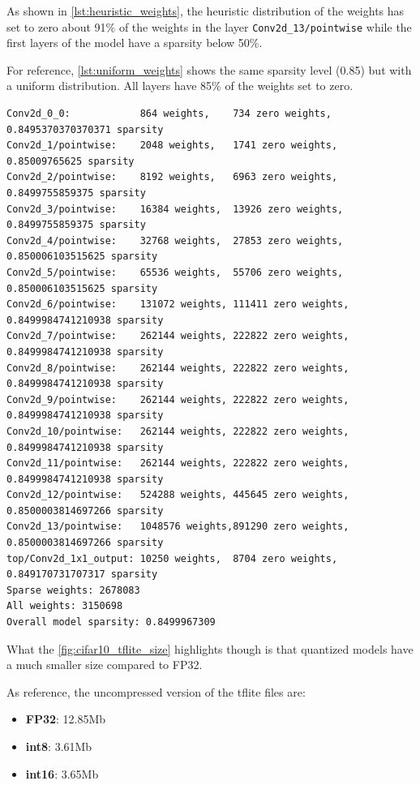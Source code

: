 As shown in \autoref{lst:heuristic_weights}, the heuristic distribution of the
weights has set to zero about 91\% of the weights in the layer
\texttt{Conv2d\_13/pointwise} while the first layers of the model have a
sparsity below 50\%.

For reference, \autoref{lst:uniform_weights} shows the same sparsity level
(0.85) but with a uniform distribution. All layers have 85\% of the weights set
to zero.

\begin{lstlisting}[label={lst:uniform_weights},
    caption=MobileNet v1 and CIFAR-10: uniform weights distributions]
Conv2d_0_0:            864 weights,    734 zero weights,    0.8495370370370371 sparsity
Conv2d_1/pointwise:    2048 weights,   1741 zero weights,   0.85009765625 sparsity
Conv2d_2/pointwise:    8192 weights,   6963 zero weights,   0.8499755859375 sparsity
Conv2d_3/pointwise:    16384 weights,  13926 zero weights,  0.8499755859375 sparsity
Conv2d_4/pointwise:    32768 weights,  27853 zero weights,  0.850006103515625 sparsity
Conv2d_5/pointwise:    65536 weights,  55706 zero weights,  0.850006103515625 sparsity
Conv2d_6/pointwise:    131072 weights, 111411 zero weights, 0.8499984741210938 sparsity
Conv2d_7/pointwise:    262144 weights, 222822 zero weights, 0.8499984741210938 sparsity
Conv2d_8/pointwise:    262144 weights, 222822 zero weights, 0.8499984741210938 sparsity
Conv2d_9/pointwise:    262144 weights, 222822 zero weights, 0.8499984741210938 sparsity
Conv2d_10/pointwise:   262144 weights, 222822 zero weights, 0.8499984741210938 sparsity
Conv2d_11/pointwise:   262144 weights, 222822 zero weights, 0.8499984741210938 sparsity
Conv2d_12/pointwise:   524288 weights, 445645 zero weights, 0.8500003814697266 sparsity
Conv2d_13/pointwise:   1048576 weights,891290 zero weights, 0.8500003814697266 sparsity
top/Conv2d_1x1_output: 10250 weights,  8704 zero weights,   0.849170731707317 sparsity
Sparse weights: 2678083
All weights: 3150698
Overall model sparsity: 0.8499967309
\end{lstlisting}

What the \autoref{fig:cifar10_tflite_size} highlights though is that quantized
models have a much smaller size compared to FP32.

As reference, the uncompressed version of the tflite files are:
\begin{itemize}
    \item \textbf{FP32}: 12.85Mb
    \item \textbf{int8}: 3.61Mb
    \item \textbf{int16}: 3.65Mb
\end{itemize}

